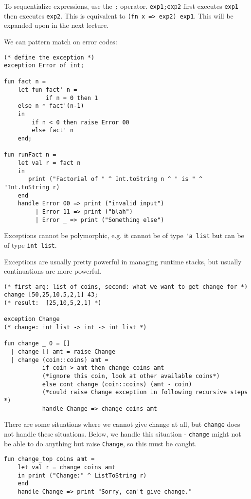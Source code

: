 \documentclass[11pt]{article}
\begin{document}
To sequentialize expressions, use the \verb~;~ operator. \verb~exp1;exp2~ first executes \verb~exp1~ then executes \verb~exp2~. This is equivalent to \verb~(fn x => exp2) exp1~. This will be expanded upon in the next lecture.

We can pattern match on error codes:

\begin{verbatim}
(* define the exception *)
exception Error of int;

fun fact n =
    let fun fact' n =
	        if n = 0 then 1
    else n * fact'(n-1)
    in
        if n < 0 then raise Error 00
        else fact' n
    end;

fun runFact n =
    let val r = fact n
    in 
       print ("Factorial of " ^ Int.toString n ^ " is " ^ "Int.toString r)
    end
    handle Error 00 => print ("invalid input")
         | Error 11 => print ("blah")
         | Error _ => print ("Something else")
\end{verbatim}

Exceptions cannot be polymorphic, e.g. it cannot be of type \verb~'a list~ but can be of type \verb~int list~.

Exceptions are usually pretty powerful in managing runtime stacks, but usually continuations are more powerful.

\begin{verbatim}
(* first arg: list of coins, second: what we want to get change for *)
change [50,25,10,5,2,1] 43;
(* result:  [25,10,5,2,1] *)

exception Change 
(* change: int list -> int -> int list *)

fun change _ 0 = []
  | change [] amt = raise Change
  | change (coin::coins) amt = 
           if coin > amt then change coins amt  
           (*ignore this coin, look at other available coins*)
           else cont change (coin::coins) (amt - coin) 
           (*could raise Change exception in following recursive steps *)
           handle Change => change coins amt

\end{verbatim}

There are some situations where we cannot give change at all, but \verb~change~ does not handle these situations. Below, we handle this situation - \verb~change~ might not be able to do anything but raise \verb~Change~, so this must be caught.

\begin{verbatim}
fun change_top coins amt =
    let val r = change coins amt
    in print ("Change:" ^ ListToString r)
    end
    handle Change => print "Sorry, can't give change."
\end{verbatim}
\end{document}
